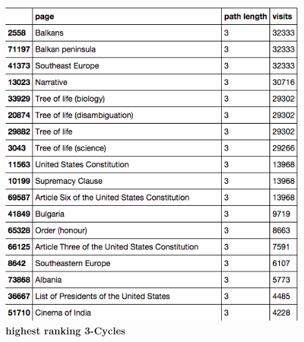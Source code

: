 \documentclass[pre,twocolumn,twoside,superscriptaddress,floatfix, aps, 10pt]{revtex4-1}
\begin{document}
\begin{figure}[tp!]
  \centering	
  \includegraphics[width=\columnwidth]{graphics/top_3loops.png}
  \caption{
    \textbf{highest ranking 3-Cycles}
  }
  \label{fig:Highest Ranking 3-Cyles}
\end{figure}
\end{document}
